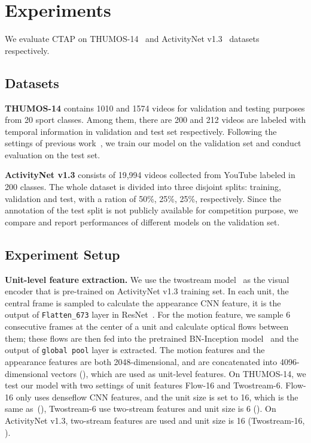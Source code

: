 \documentclass[runningheads]{llncs}
\begin{document}
\section{Experiments}\label{sec: exp}
We evaluate CTAP on THUMOS-14~\cite{THUMOS14} and ActivityNet v1.3~\cite{caba2015activitynet} datasets respectively.

\setlength{\parindent}{0pt}
\subsection{Datasets}

\textbf{THUMOS-14} contains 1010 and 1574 videos for validation and testing purposes from 20 sport classes. 
Among them, there are 200 and 212 videos are labeled with temporal information in validation and test set respectively. 
Following the settings of previous work~\cite{Gao_2017_ICCV,Shou_2016_CVPR}, we train our model on the validation set and conduct evaluation on the test set. 

\textbf{ActivityNet v1.3} consists of 19,994 videos collected from YouTube labeled in 200 classes. 
The whole dataset is divided into three disjoint splits: training, validation and test, with a ration of 50\%, 25\%, 25\%, respectively. 
Since the annotation of the test split is not publicly available for competition purpose, we compare and report performances of different models on the validation set. 

\subsection{Experiment Setup}\label{ssec: exp setup}
\textbf{Unit-level feature extraction.} We use the twostream model~\cite{xiong2016cuhk} as the visual encoder  that is pre-trained on ActivityNet v1.3 training set. In each unit, the central frame is sampled to calculate the appearance CNN feature, it is the output of \texttt{Flatten\_673} layer in ResNet~\cite{He_2016_CVPR}. For the motion feature, we sample 6 consecutive frames at the center of a unit and calculate optical flows between them; these flows are then fed into the pretrained BN-Inception model~\cite{ioffe2015batch} and the output of \texttt{global pool} layer is extracted. The motion features and the appearance features are both 2048-dimensional, and are concatenated into 4096-dimensional vectors (), which are used as unit-level features. On THUMOS-14, we test our model with two settings of unit features Flow-16 and Twostream-6. Flow-16 only uses denseflow CNN features, and the unit size is set to 16, which is the same as~\cite{Gao_2017_ICCV}(), Twostream-6 use two-stream features and unit size is 6 (). On ActivityNet v1.3, two-stream features are used and unit size is 16 (Twostream-16, ).
\end{document}
